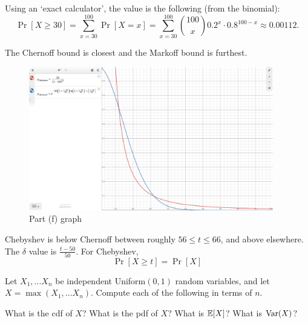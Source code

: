 \documentclass[11pt]{article}
\begin{document}
\begin{solution}
\begin{Parts}
Using an `exact calculator', the value is the following (from the binomial):
\[
    \Pr[X \geq 30] = \sum_{x=30}^{100} \Pr[X = x] = 
    \sum_{x=30}^{100} \binom{100}{x} 0.2^x \cdot 0.8^{100-x} \approx
    0.00112.
\]

The Chernoff bound is closest and the Markoff bound is furthest. 
\pagebreak
\Part 
\begin{figure}[h]
    \centering
    \includegraphics[width=0.95\textwidth]{graph.png} 
    \caption{Part (f) graph}
\end{figure}

Chebyshev is below Chernoff between roughly $56 \leq t \leq 66$, and above
elsewhere. The $\delta$ value is $\frac{t-50}{50}$. For Chebyshev, 
\[
    \Pr[X \geq t] = \Pr[X ]
\]

\end{Parts}

\end{solution}

Let $X_1,...X_n$ be independent Uniform$(0,1)$ random variables, and let $X = 
\max(X_1,...X_n)$. Compute each of the following in terms of $n$.
\begin{Parts}
	\Part What is the cdf of $X$?
	\Part What is the pdf of $X$?
	\Part What is $\operatorname{\mathbb{E}}[X]$?
	\Part What is $\operatorname{Var}(X)$?
\end{Parts}
\end{document}
